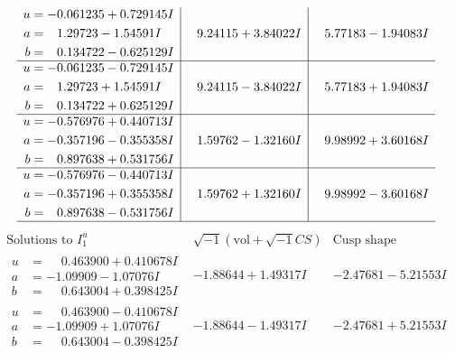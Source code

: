 \documentclass[1p]{elsarticle_modified}
\theoremstyle{definition}
\newcommand{\I}{\sqrt{-1}}
\begin{document}
$$\begin{array}{c|c|c}
\begin{aligned}
u &= -0.061235 + 0.729145 I \\
a &= \phantom{-}1.29723 - 1.54591 I \\
b &= \phantom{-}0.134722 - 0.625129 I\end{aligned}
 & \phantom{-}9.24115 + 3.84022 I & \phantom{-}5.77183 - 1.94083 I \\ \hline\begin{aligned}
u &= -0.061235 - 0.729145 I \\
a &= \phantom{-}1.29723 + 1.54591 I \\
b &= \phantom{-}0.134722 + 0.625129 I\end{aligned}
 & \phantom{-}9.24115 - 3.84022 I & \phantom{-}5.77183 + 1.94083 I \\ \hline\begin{aligned}
u &= -0.576976 + 0.440713 I \\
a &= -0.357196 - 0.355358 I \\
b &= \phantom{-}0.897638 + 0.531756 I\end{aligned}
 & \phantom{-}1.59762 - 1.32160 I & \phantom{-}9.98992 + 3.60168 I \\ \hline\begin{aligned}
u &= -0.576976 - 0.440713 I \\
a &= -0.357196 + 0.355358 I \\
b &= \phantom{-}0.897638 - 0.531756 I\end{aligned}
 & \phantom{-}1.59762 + 1.32160 I & \phantom{-}9.98992 - 3.60168 I\\
 \hline 
 \end{array}$$\newpage$$\begin{array}{c|c|c}  
\text{Solutions to }I^u_{1}& \I (\text{vol} + \sqrt{-1}CS) & \text{Cusp shape}\\
 \hline 
\begin{aligned}
u &= \phantom{-}0.463900 + 0.410678 I \\
a &= -1.09909 - 1.07076 I \\
b &= \phantom{-}0.643004 + 0.398425 I\end{aligned}
 & -1.88644 + 1.49317 I & -2.47681 - 5.21553 I \\ \hline\begin{aligned}
u &= \phantom{-}0.463900 - 0.410678 I \\
a &= -1.09909 + 1.07076 I \\
b &= \phantom{-}0.643004 - 0.398425 I\end{aligned}
 & -1.88644 - 1.49317 I & -2.47681 + 5.21553 I \\ \hline\begin{aligned}

\end{aligned}
\end{array}$$
\end{document}
